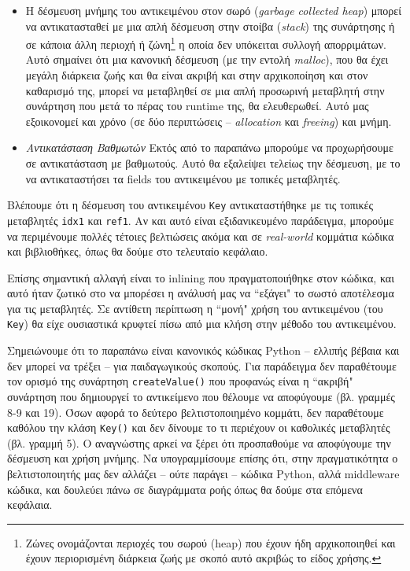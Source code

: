\begin{itemize}

\item Η δέσμευση μνήμης του αντικειμένου στον σωρό (\textit{garbage collected
heap}) μπορεί να αντικατασταθεί με μια απλή δέσμευση στην στοίβα
(\textit{stack}) της συνάρτησης ή σε κάποια άλλη περιοχή ή ζώνη\footnote{Ζώνες
ονομάζονται περιοχές του σωρού (heap) που έχουν ήδη αρχικοποιηθεί και έχουν
περιορισμένη διάρκεια ζωής με σκοπό αυτό ακριβώς το είδος χρήσης.} η οποία δεν
υπόκειται συλλογή απορριμάτων. Αυτό σημαίνει ότι μια κανονική δέσμευση (με την
εντολή \textit{malloc}), που θα έχει μεγάλη διάρκεια ζωής και θα είναι ακριβή
και στην αρχικοποίηση και στον καθαρισμό της, μπορεί να μεταβληθεί σε μια απλή
προσωρινή μεταβλητή στην συνάρτηση που μετά το πέρας του runtime της, θα
ελευθερωθεί. Αυτό μας εξοικονομεί και χρόνο (σε δύο περιπτώσεις –
\textit{allocation} και \textit{freeing}) και μνήμη.

\item \textit{Αντικατάσταση Βαθμωτών} Εκτός από το παραπάνω μπορούμε
να προχωρήσουμε σε αντικατάσταση με βαθμωτούς. Αυτό θα εξαλείψει τελείως την
δέσμευση, με το να αντικαταστήσει τα fields του αντικειμένου με τοπικές
μεταβλητές.

\end{itemize}

Βλέπουμε ότι η δέσμευση του αντικειμένου \texttt{Key} αντικαταστήθηκε με τις
τοπικές μεταβλητές \texttt{idx1} και \texttt{ref1}. Αν και αυτό είναι
εξιδανικευμένο παράδειγμα, μπορούμε να περιμένουμε πολλές τέτοιες βελτιώσεις
ακόμα και σε \textit{real-world} κομμάτια κώδικα και βιβλιοθήκες, όπως θα δούμε
στο τελευταίο κεφάλαιο.

Επίσης σημαντική αλλαγή είναι το inlining που πραγματοποιήθηκε στον κώδικα, και
αυτό ήταν ζωτικό στο να μπορέσει η ανάλυσή μας να ``εξάγει" το σωστό αποτέλεσμα
για τις μεταβλητές. Σε αντίθετη περίπτωση η ``μονή" χρήση του αντικειμένου (του
\texttt{Key}) θα είχε ουσιαστικά κρυφτεί πίσω από μια κλήση στην μέθοδο του
αντικειμένου.

Σημειώνουμε ότι  το παραπάνω είναι κανονικός κώδικας Python – ελλιπής βέβαια και
δεν μπορεί να τρέξει – για παιδαγωγικούς σκοπούς. Για παράδειγμα δεν παραθέτουμε
τον ορισμό της συνάρτηση \texttt{createValue()} που προφανώς είναι η ``ακριβή"
συνάρτηση που δημιουργεί το αντικείμενο που θέλουμε να αποφύγουμε (βλ. γραμμές
8-9 και 19). Όσων αφορά το δεύτερο βελτιστοποιημένο κομμάτι, δεν παραθέτουμε
καθόλου την κλάση \texttt{Key()} και δεν δίνουμε το τι περιέχουν οι καθολικές
μεταβλητές (βλ. γραμμή 5). Ο αναγνώστης αρκεί να ξέρει ότι προσπαθούμε να
αποφύγουμε την δέσμευση και χρήση μνήμης. Να υπογραμμίσουμε επίσης ότι, στην
πραγματικότητα ο βελτιστοποιητής μας δεν αλλάζει – ούτε παράγει – κώδικα Python,
αλλά middleware κώδικα, και δουλεύει πάνω σε διαγράμματα ροής όπως θα δούμε στα
επόμενα κεφάλαια.


